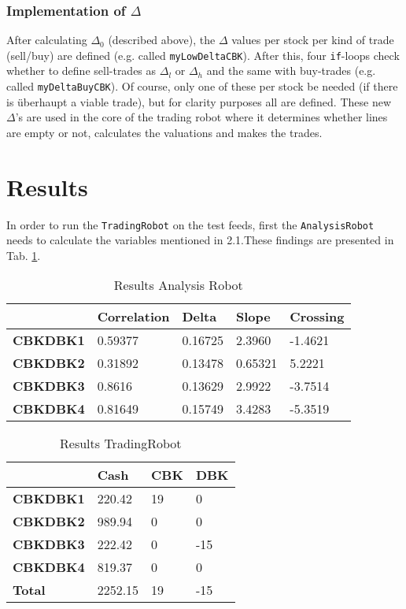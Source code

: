 \documentclass[a4paper]{article}
\begin{document}
\subsubsection{Implementation of $\Delta$}
After calculating $\Delta_0$ (described above), the $\Delta$ values per stock per kind of trade (sell/buy) are defined (e.g. called \texttt{myLowDeltaCBK}). After this, four \texttt{if}-loops check whether to define sell-trades as $\Delta_l$ or $\Delta_h$ and the same with buy-trades (e.g. called \texttt{myDeltaBuyCBK}). Of course, only one of these per stock be needed (if there is \"uberhaupt a viable trade), but for clarity purposes all are defined. These new $\Delta$'s are used in the core of the trading robot where it determines whether lines are empty or not, calculates the valuations and makes the trades.

\section{Results}

In order to run the \texttt{TradingRobot} on the test feeds, first the \texttt{AnalysisRobot} needs to calculate the variables mentioned in 2.1.These findings are presented in Tab. \ref{tab:corpar}. 

\begin{table}[h!]
\centering
\caption{Results Analysis Robot}
\label{tab:corpar}
\begin{tabular}{lllll}
                 & \textbf{Correlation} & \textbf{Delta} & \textbf{Slope} & \textbf{Crossing} \\
                 \hline
\textbf{CBKDBK1} & 0.59377              & 0.16725        & 2.3960         & -1.4621           \\
\textbf{CBKDBK2} & 0.31892              & 0.13478        & 0.65321        & 5.2221            \\
\textbf{CBKDBK3} & 0.8616               & 0.13629        & 2.9922         & -3.7514           \\
\textbf{CBKDBK4} & 0.81649              & 0.15749        & 3.4283         & -5.3519\\          \hline
\end{tabular}
\end{table}

\begin{table}[tbp]
\centering
\caption{Results TradingRobot}
\label{
1}
\begin{tabular}{llll}
\hline
\textbf{}        & \textbf{Cash} & \textbf{CBK} & \textbf{DBK} \\
\hline
\textbf{CBKDBK1} & 220.42        & 19           & 0            \\
\textbf{CBKDBK2} & 989.94        & 0            & 0            \\
\textbf{CBKDBK3} & 222.42        & 0            & -15          \\
\textbf{CBKDBK4} & 819.37        & 0            & 0            \\
\hline
\textbf{Total}   & 2252.15       & 19           & -15          \\
\hline
\end{tabular}
\end{table}
\end{document}
